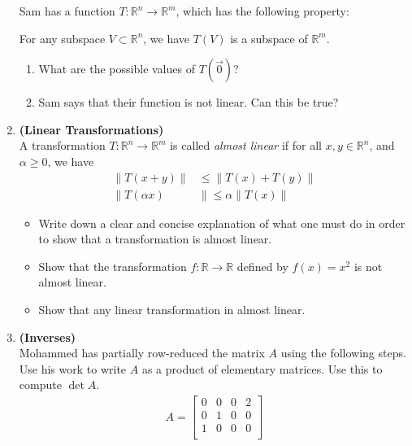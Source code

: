 \documentclass[red]{tutorial}
\newcommand{\R}{\mathbb{R}}
\theoremstyle{definition}
\theoremstyle{theorem}
\begin{document}
\begin{tutorial}
\begin{enumerate}
{      Sam has a function $T\colon\R^n\to \R^m$, which has the following
      property:
      \begin{center}
        For any subspace $V\subset \R^n$, we have $T(V)$ is a subspace of $\R^m$.
      \end{center}
      \begin{enumerate}
        \item What are the possible values of $T(\vec0)$?
        \item Sam says that their function is not linear. Can this be true?
      \end{enumerate}
      }
    \item \textbf{(Linear Transformations)}\\
      A transformation $T:\R^n\to \R^m$ is called 
      \textit{almost linear} if for all $x,y\in \R^n$, and 
      $\alpha\ge 0$, we have 
      \begin{align*}
        \|T(x+y)\| &\le \|T(x)+T(y)\|\\
        \|T(\alpha x)&\|\le \alpha \|T(x)\|
      \end{align*}
      \begin{itemize}
        \item Write down a clear and concise explanation of what 
          one must do in order to show that a transformation is 
          almost linear.
        \item Show that the transformation $f:\R\to\R$ defined 
          by $f(x) = x^2$ is not almost linear.
        \item Show that any linear transformation in almost linear.
      \end{itemize}
    \item \textbf{(Inverses)}\\
      \newcommand{\pmin}{\phantom{-}}
      \newcommand{\row}[1]{\mathrm{r}_{#1}}
      Mohammed has partially row-reduced the matrix $A$ using the
      following steps. Use his work to write $A$ as a product of elementary
      matrices. Use this to compute $\det A$.
      \begin{align*}
        A = \begin{bmatrix}
          0 & 0 & 0 & 2 \\
          0 & 1 & 0 & 0 \\
          1 & 0 & 0 & 0 \\

\end{bmatrix}
\end{align*}
\end{enumerate}
\end{tutorial}
\end{document}
